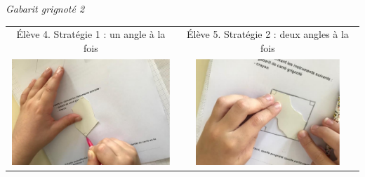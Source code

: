 {\it Gabarit grignoté 2} \\
\begin{tabular}{C{8}C{8}}
   Élève 4. Stratégie 1 : un angle à la fois
   &
   Élève 5. Stratégie 2 : deux angles à la fois \\
   \includegraphics[height=4cm]{Geometrie_did/Images/Geo5_crpe_gabarit_E5}
   &
   \includegraphics[height=4cm]{Geometrie_did/Images/Geo5_crpe_gabarit_E6} \\
\end{tabular}


\analyses

